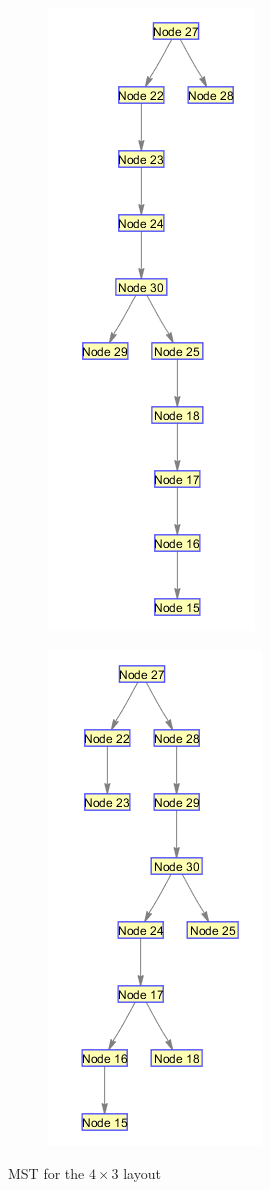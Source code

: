 \begin{figure}[!ht]
\centering
\begin{subfigure}[b]{0.4\textwidth}
\centering
\includegraphics[scale=0.7]{./pics/MST4x3_1.png}
\hfill
\end{subfigure}
\begin{subfigure}[b]{0.4\textwidth}
\centering
\includegraphics[scale=0.7]{./pics/MST4x3_2.png}
\hfill
\end{subfigure}
\caption{MST for the $4 \times 3$ layout}
\label{fig:MST4x3}
\end{figure}

